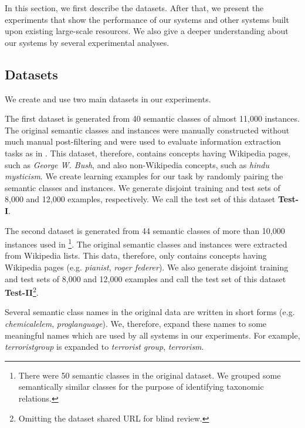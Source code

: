 In this section, we first describe the datasets. After that, we
present the experiments that show the performance of our systems and
other systems built upon existing large-scale resources. We also give
a deeper understanding about our systems by several experimental
analyses.

\subsection{Datasets}
\label{sec:dataset}
We create and use two main datasets in our experiments. 

The first dataset is generated from 40 semantic classes of almost
11,000 instances. The original semantic classes and instances were
manually constructed without much manual post-filtering and were used
to evaluate information extraction tasks as in
\cite{citeulike:1587018,pacsca-vandurme:2008:ACLMain}.  This dataset,
therefore, contains concepts having Wikipedia pages, such as {\em
  George W. Bush}, and also non-Wikipedia concepts, such as {\em hindu
  mysticism}. We create learning examples for our task by randomly
pairing the semantic classes and instances. We generate disjoint
training and test sets of 8,000 and 12,000 examples, respectively. We
call the test set of this dataset {\bf Test-I}.

The second dataset is generated from 44 semantic classes of more than
10,000 instances used in
\cite{vyas-pantel:2009:NAACLHLT09}\footnote{There were 50 semantic
  classes in the original dataset. We grouped some semantically
  similar classes for the purpose of identifying taxonomic
  relations.}. The original semantic classes and instances were
extracted from Wikipedia lists. This data, therefore, only contains
concepts having Wikipedia pages (e.g. {\em pianist}, {\em roger
  federer}). We also generate disjoint training and test sets of 8,000
and 12,000 examples and call the test set of this dataset {\bf
  Test-II}\footnote{Omitting the dataset shared URL for blind
  review.}.


Several semantic class names in the original data are written in short
forms (e.g. {\em chemicalelem}, {\em proglanguage}). We, therefore,
expand these names to some meaningful names which are used by all
systems in our experiments. For example, {\em terroristgroup} is
expanded to {{\em terrorist group}, {\em terrorism}}.

